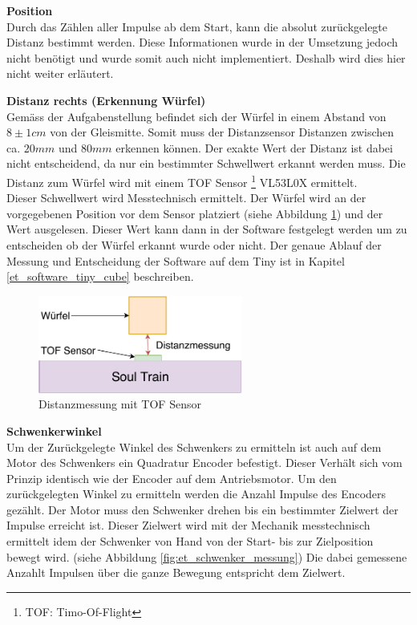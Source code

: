 \documentclass[../../main.tex]{subfiles}
\begin{document}
    \textbf{Position}\\
    Durch das Zählen aller Impulse ab dem Start, kann die absolut zurückgelegte Distanz bestimmt werden. Diese Informationen wurde in der Umsetzung jedoch nicht benötigt und wurde somit auch nicht implementiert. Deshalb wird dies hier nicht weiter erläutert.

    
    \textbf{Distanz rechts (Erkennung Würfel) }\\
    Gemäss der Aufgabenstellung befindet sich der Würfel in einem Abstand von $8\pm1cm$ von der Gleismitte. Somit muss der Distanzsensor Distanzen zwischen ca. $20mm$ und $80mm$ erkennen können. Der exakte Wert der Distanz ist dabei nicht entscheidend, da nur ein bestimmter Schwellwert erkannt werden muss. Die Distanz zum Würfel wird mit einem TOF Sensor \footnote{TOF: Timo-Of-Flight} VL53L0X ermittelt. \\
    Dieser Schwellwert wird Messtechnisch ermittelt. Der Würfel wird an der vorgegebenen Position vor dem Sensor platziert (siehe Abbildung \ref{fig:et_tof_messung}) und der Wert ausgelesen. Dieser Wert kann dann in der Software festgelegt werden um zu entscheiden ob der Würfel erkannt wurde oder nicht. Der genaue Ablauf der Messung und Entscheidung der Software auf dem Tiny ist in Kapitel \ref{et_software_tiny_cube} beschreiben.

    \begin{figure}[H]
        \centering
        \includegraphics[width=0.6\textwidth]{../../images/et/et_tof_messung.pdf}
        \caption {Distanzmessung mit TOF Sensor}
        \label{fig:et_tof_messung}
    \end{figure}

    \textbf{Schwenkerwinkel}\\
    Um der Zurückgelegte Winkel des Schwenkers zu ermitteln ist auch auf dem Motor des Schwenkers ein Quadratur Encoder befestigt. Dieser Verhält sich vom Prinzip identisch wie der Encoder auf dem Antriebsmotor. Um den zurückgelegten Winkel zu ermitteln werden die Anzahl Impulse des Encoders gezählt. Der Motor muss den Schwenker drehen bis ein bestimmter Zielwert der Impulse erreicht ist. Dieser Zielwert wird mit der Mechanik messtechnisch ermittelt idem der Schwenker von Hand von der Start- bis zur Zielposition bewegt wird. (siehe Abbildung \ref{fig:et_schwenker_messung}) Die dabei gemessene Anzahlt Impulsen über die ganze Bewegung entspricht dem Zielwert.
\end{document}
